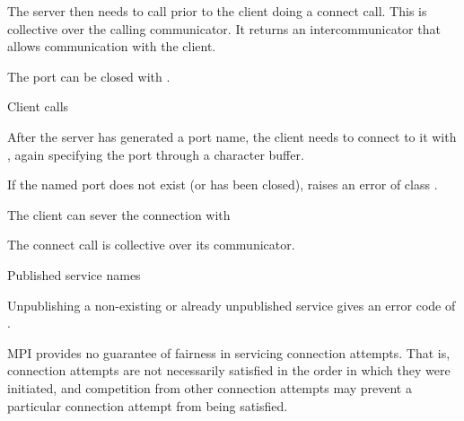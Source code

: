 The server then needs to call 
 prior to the client doing a connect call.
This is collective over the calling communicator. It returns an
intercommunicator that allows communication with the client.

The port can be closed with 
.

 {Client calls}

After the server has generated a port name, the client 
needs to connect to it with
, again specifying the port through a character buffer.

If the named port does not exist (or has been closed),
 raises an error of class .

The client can sever the connection with

The connect call is collective over its communicator.

 {Published service names}



Unpublishing a non-existing or already unpublished service gives an
error code of .


MPI provides no guarantee of fairness in servicing connection
attempts. That is, connection attempts are not necessarily satisfied
in the order in which they were initiated, and competition from other
connection attempts may prevent a particular connection attempt from
being satisfied.


